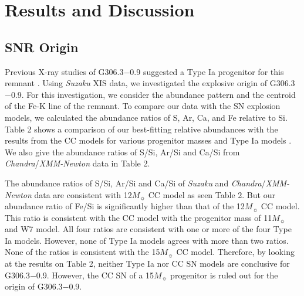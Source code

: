 \documentclass[useAMS,usenatbib]{mn2e}
\begin{document}
\section{Results and Discussion}

\subsection {SNR Origin}
Previous X-ray studies of G306.3$-$0.9 suggested a Type Ia progenitor for this remnant \citep {Re13, Co16}. Using {\it Suzaku} XIS data, we investigated the explosive origin of G306.3$-$0.9. For this investigation, we consider the abundance pattern and the centroid of the Fe-K line of the remnant. To compare our data with the SN explosion models, we calculated the abundance ratios of S, Ar, Ca, and Fe relative to Si. Table 2 shows a comparison of our best-fitting relative abundances with the results from the CC models \citep {Wo95} for various progenitor masses and Type Ia models \citep {No97,Ba03}. We also give the abundance ratios of S/Si, Ar/Si and Ca/Si from {\it Chandra}/{\it XMM-Newton} data \citep {Co16} in Table 2. 

The abundance ratios of S/Si, Ar/Si and Ca/Si of {\it Suzaku} and {\it Chandra}/{\it XMM-Newton} data are consistent with 12$M_{\sun}$ CC model as seen Table 2. But our abundance ratio of Fe/Si is significantly higher than that of the 12$M_{\sun}$ CC model. This ratio is consistent with the CC model with the progenitor mass of 11$M_{\sun}$ and W7 model. All four ratios are consistent with one or more of the four Type Ia models. However, none of Type Ia models agrees with more than two ratios. None of the ratios is consistent with the 15$M_{\sun}$ CC model. Therefore, by looking at the results on Table 2, neither Type Ia nor CC SN models are conclusive for G306.3$-$0.9. However, the CC SN of a 15$M_{\sun}$ progenitor is ruled out for the origin of G306.3$-$0.9.
\end{document}
